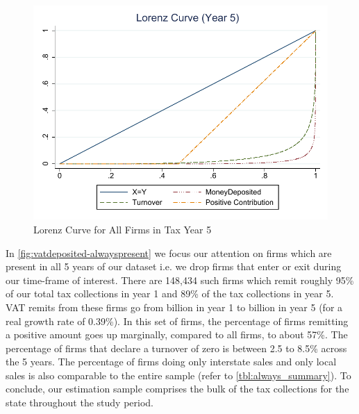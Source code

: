 \begin{figure}[ht]
\scriptsize
\centering
\includegraphics[width=.7\textwidth]{graphs/LorenzCurve_TaxYear5.pdf}
\caption{Lorenz Curve for All Firms in Tax Year 5}
\label{fig:lorenzyear5}
\end{figure}

In \cref{fig:vatdeposited-alwayspresent} we focus our attention on firms which are present in all 5 years of our dataset i.e. we drop firms that enter or exit during our time-frame of interest. There are 148,434 such firms which remit roughly 95\% of our total tax collections in year 1 and 89\% of the tax collections in year 5. VAT
remits from these firms go from  billion in year 1 to  billion in year 5 (for a real growth rate of 0.39\%). In this set of firms, the percentage of firms remitting a positive amount goes up marginally, compared to all firms, to about 57\%. The percentage of firms that declare a turnover of zero is
between 2.5 to 8.5\% across the 5 years. The percentage of firms doing only interstate sales and only local sales is also comparable to the entire sample (refer to \cref{tbl:always_summary}). To conclude, our estimation sample comprises the bulk of the tax collections for the state throughout the study period. 




